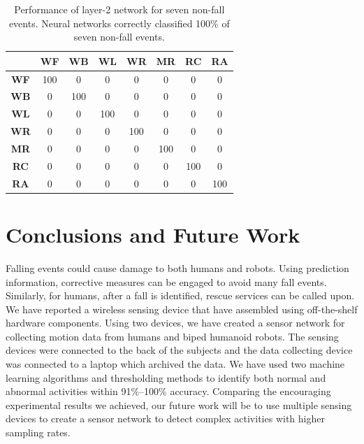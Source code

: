 \documentclass{IEEEtran}
\begin{document}
\begin{table}[htb]
\caption{Performance of layer-2 network for  seven non-fall events. Neural networks correctly classified 100\% of  seven non-fall events.}
\label{Layer2NonFallEventsNeuralNets}
{
\begin{tabular}{|c|c|c|c|c|c|c|c|}
\hline 
 & \textbf{WF} & \textbf{WB} & \textbf{WL} & \textbf{WR} & \textbf{MR} & 
\textbf{RC} & \textbf{RA} \\ \hline 
\textbf{WF} & 100 &  0 &  0 &  0 &  0 &  0 &  0 \\ \hline
\textbf{WB} & 0 &  100 &  0 &  0 &  0 &  0 &  0 \\ \hline
\textbf{WL} & 0 &  0 &  100 &  0 &  0 &  0 &  0 \\ \hline
\textbf{WR} & 0 &  0 &  0 &  100 &  0 &  0 &  0 \\ \hline
\textbf{MR} & 0 &  0 &  0 &  0 &  100 &  0 &  0 \\ \hline
\textbf{RC} & 0 &  0 &  0 &  0 &  0 &  100 &  0 \\ \hline
\textbf{RA} & 0 &  0 &  0 &  0 &  0 &  0 &  100 \\ \hline
\end{tabular}
}
\end{table}



\section{Conclusions and Future Work}

Falling events could cause damage to both humans and robots.  Using prediction information, 
corrective measures can be engaged to avoid 
 many fall events. Similarly, for humans, after  a fall is identified, rescue services 
 can be called upon. We have reported a wireless sensing device that have assembled using 
off-the-shelf hardware components. Using two devices, we have created a sensor network for 
collecting motion data from humans and biped humanoid robots. The sensing devices were connected to 
the back of the subjects and the data collecting device was connected to a laptop which archived 
the data. We have used two machine learning algorithms and thresholding methods to 
identify both normal and abnormal activities within 91\%--100\% accuracy. Comparing the encouraging 
experimental results we achieved, our future work will be to use multiple sensing devices to create 
a sensor network to detect complex activities with higher sampling rates.  




\end{document}

